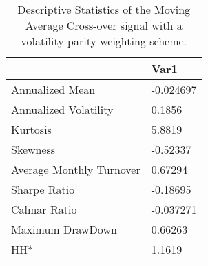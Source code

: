 \begin{table}[H]
\centering
\begin{tabular}{ll}
& Var1 \\ 
\hline 
Annualized Mean & -0.024697 \\ 
Annualized Volatility & 0.1856 \\ 
Kurtosis & 5.8819 \\ 
Skewness & -0.52337 \\ 
Average Monthly Turnover & 0.67294 \\ 
Sharpe Ratio & -0.18695 \\ 
Calmar Ratio & -0.037271 \\ 
Maximum DrawDown & 0.66263 \\ 
HH* & 1.1619 \\ 
\hline
\end{tabular}
\caption{Descriptive Statistics of the Moving Average Cross-over signal with a volatility parity weighting scheme.}
\label{MAVP}
\end{table}